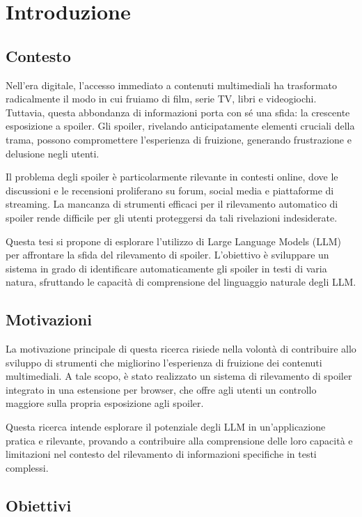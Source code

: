 \chapter{Introduzione}
\label{ch:introduzione}

\section{Contesto}
\label{sec:contesto}
Nell'era digitale, l'accesso immediato a contenuti
multimediali ha trasformato radicalmente il modo in cui
fruiamo di film, serie TV, libri e videogiochi.
Tuttavia, questa abbondanza di informazioni porta con sé
una sfida: la crescente esposizione a spoiler.
Gli spoiler, rivelando anticipatamente elementi cruciali
della trama, possono compromettere l'esperienza di
fruizione, generando frustrazione e delusione negli utenti.

Il problema degli spoiler è particolarmente rilevante in
contesti online, dove le discussioni e le recensioni
proliferano su forum, social media e piattaforme di
streaming.
La mancanza di strumenti efficaci per il rilevamento
automatico di spoiler rende difficile per gli utenti
proteggersi da tali rivelazioni indesiderate.

Questa tesi si propone di esplorare l'utilizzo di Large
Language Models (LLM) per affrontare la sfida del
rilevamento di spoiler.
L'obiettivo è sviluppare un sistema in grado di
identificare automaticamente gli spoiler in testi di varia
natura, sfruttando le capacità di comprensione del
linguaggio naturale degli LLM.

\section{Motivazioni}
\label{sec:motivazioni}
La motivazione principale di questa ricerca risiede nella
volontà di contribuire allo sviluppo di strumenti che
migliorino l'esperienza di fruizione dei contenuti
multimediali.
A tale scopo, è stato realizzato un sistema di rilevamento
di spoiler integrato in una estensione per browser, che
offre agli utenti un controllo maggiore sulla propria
esposizione agli spoiler.

Questa ricerca intende esplorare il potenziale degli LLM in
un'applicazione pratica e rilevante, provando a contribuire
alla comprensione delle loro capacità e limitazioni nel
contesto del rilevamento di informazioni specifiche in
testi complessi.

\section{Obiettivi}
\label{sec:obiettivi}

